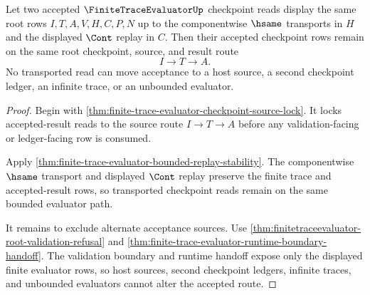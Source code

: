 \begin{theorem}
\label{thm:finitetrace-evaluator-acceptance-row-stability}
Let two accepted $\FiniteTraceEvaluatorUp$ checkpoint reads display the same
root rows $I,T,A,V,H,C,P,N$ up to the componentwise $\hsame$ transports in
$H$ and the displayed $\Cont$ replay in $C$. Then their accepted checkpoint
rows remain on the same root checkpoint, source, and result route
$$
I \to T \to A.
$$
No transported read can move acceptance to a host source, a second checkpoint
ledger, an infinite trace, or an unbounded evaluator.
\end{theorem}
\begin{proof}
Begin with \autoref{thm:finite-trace-evaluator-checkpoint-source-lock}. It
locks accepted-result reads to the source route $I \to T \to A$ before any
validation-facing or ledger-facing row is consumed.

Apply \autoref{thm:finite-trace-evaluator-bounded-replay-stability}. The
componentwise $\hsame$ transport and displayed $\Cont$ replay preserve the
finite trace and accepted-result rows, so transported checkpoint reads remain
on the same bounded evaluator path.

It remains to exclude alternate acceptance sources. Use
\autoref{thm:finitetraceevaluator-root-validation-refusal} and
\autoref{thm:finite-trace-evaluator-runtime-boundary-handoff}. The validation
boundary and runtime handoff expose only the displayed finite evaluator rows,
so host sources, second checkpoint ledgers, infinite traces, and unbounded
evaluators cannot alter the accepted route.
\end{proof}

